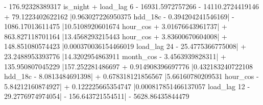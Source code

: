 - 176.92328389317 is_{night} + load_{lag 6} - 16931.5972757266  - 14110.2724419146  + 79.1223402622162 \left|{0.963027226950375 hdd_{18c} - 0.394204241546169}\right| - 1086.17013611475 \left|{10.5108920601674 hour_{cos} + 3.01676643961737}\right| + 863.827118701164 \left|{13.4568293215443 hour_{cos} + 3.83600670604008}\right| + 148.851080574423 \left|{0.000370036154466019 load_{lag 24} - 25.4775366775008}\right| + 23.2488953393776 \left|{14.3202954863911 month_{cos} - 3.4563939828311}\right| + 135.950807045229 \left|{157.252281486697  + 0.914908396697776 \left|{0.432183240722108 hdd_{18c} - 8.0813484691398}\right| + 0.678318121856567 \left|{5.66160780209531 hour_{cos} - 5.84212160874927}\right| + 0.122225665354747 \left|{0.000817851466137057 load_{lag 12} - 29.2776974974054}\right| - 156.643721554511}\right| - 5628.86435844479